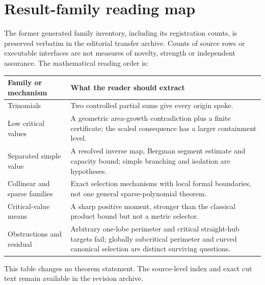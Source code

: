 \clearpage
\section{Result-family reading map}\label{sec:erdos-1041-complete-family-map}
The former generated family inventory, including its registration counts,
is preserved verbatim in the editorial transfer archive.  Counts of source
rows or executable interfaces are not measures of novelty, strength or
independent assurance.  The mathematical reading order is:
\begin{center}\small
\begin{tabular}{p{.24\linewidth}p{.65\linewidth}}
\toprule
Family or mechanism & What the reader should extract \\
\midrule
Trinomials & Two controlled partial sums give every origin spoke. \\
Low critical values & A geometric area-growth contradiction plus a finite
certificate; the scaled consequence has a larger containment level. \\
Separated simple value & A resolved inverse map, Bergman segment estimate
and capacity bound; simple branching and isolation are hypotheses. \\
Collinear and sparse families & Exact selection mechanisms with local
formal boundaries, not one general sparse-polynomial theorem. \\
Critical-value means & A sharp positive moment, stronger than the classical
product bound but not a metric selector. \\
Obstructions and residual & Arbitrary one-lobe perimeter and critical
straight-hub targets fail; globally subcritical perimeter and curved
canonical selection are distinct surviving questions. \\
\bottomrule
\end{tabular}\end{center}
This table changes no theorem statement.  The source-level index and exact
cut text remain available in the revision archive.

